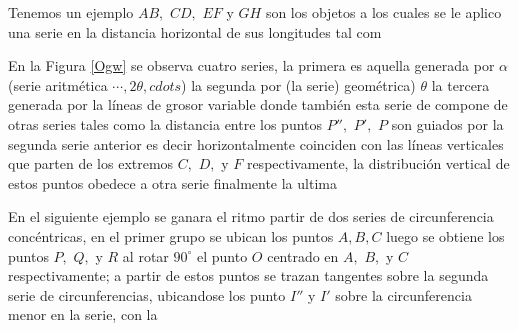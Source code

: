 \documentclass[a4paper]{book}
\begin{document}
Tenemos un ejemplo
$AB,$ $CD,$ $EF$ y $GH$ son los objetos a los cuales se le aplico una serie en la distancia horizontal de sus longitudes tal com


En la Figura \ref{Ogw} se observa cuatro series, la primera es aquella generada por $\alpha$ (serie aritmética $\cdots, 2\theta, cdots$) la segunda por (la serie) geométrica) $\theta$ la tercera generada por la líneas de grosor variable donde también esta serie de compone de otras series tales como la distancia entre los puntos $P'',$ $P',$ $P$ son guiados por la segunda serie anterior es decir horizontalmente coinciden con las líneas  verticales que parten de los extremos $C,$ $D,$ y $F$ respectivamente, la distribución vertical de estos puntos  obedece a otra serie finalmente la ultima


En el siguiente ejemplo  se ganara el ritmo partir de dos series de circunferencia  concéntricas, en el primer grupo  se ubican los puntos $A, B, C$ luego se obtiene los puntos $P,$ $Q,$ y $R$ al rotar $90^{\circ}$ el punto $O$ centrado en $A,$ $B,$ y $C$ respectivamente; a partir de estos puntos se trazan tangentes sobre la segunda serie de circunferencias, ubicandose los punto $I''$ y $I'$ sobre la circunferencia menor en la serie, con la
\end{document}
